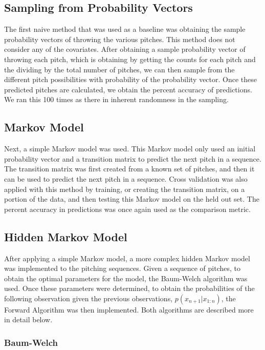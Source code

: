 \documentclass{article}
\begin{document}
\subsection{Sampling from Probability Vectors}

The first naive method that was used as a baseline was obtaining the sample probability vectors of throwing the various pitches. This method does not consider any of the covariates. After obtaining a sample probability vector of throwing each pitch, which is obtaining by getting the counts for each pitch and the dividing by the total number of pitches, we can then sample from the different pitch possibilities with probability of the probability vector. Once these predicted pitches are calculated, we obtain the percent accuracy of predictions. We ran this 100 times as there in inherent randomness in the sampling.

\subsection{Markov Model}

Next, a simple Markov model was used. This Markov model only used an initial probability vector and a transition matrix to predict the next pitch in a sequence. The transition matrix was first created from a known set of pitches, and then it can be used to predict the next pitch in a sequence. Cross validation was also applied with this method by training, or creating the transition matrix, on a portion of the data, and then testing this Markov model on the held out set. The percent accuracy in predictions was once again used as the comparison metric.  

\subsection{Hidden Markov Model}

After applying a simple Markov model, a more complex hidden Markov model was implemented to the pitching sequences. Given a sequence of pitches, to obtain the optimal parameters for the model, the Baum-Welch algorithm was used. Once these parameters were determined, to obtain the probabilities of the following observation given the previous observations, $p(x_{n+1} | x_{1:n})$, the Forward Algorithm was then implemented. Both algorithms are described more in detail below.

\subsubsection{Baum-Welch}
\end{document}
